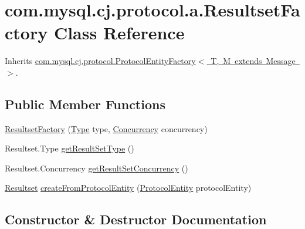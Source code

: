 \hypertarget{classcom_1_1mysql_1_1cj_1_1protocol_1_1a_1_1_resultset_factory}{}\section{com.\+mysql.\+cj.\+protocol.\+a.\+Resultset\+Factory Class Reference}
\label{classcom_1_1mysql_1_1cj_1_1protocol_1_1a_1_1_resultset_factory}


Inherits \mbox{\hyperlink{interfacecom_1_1mysql_1_1cj_1_1protocol_1_1_protocol_entity_factory}{com.\+mysql.\+cj.\+protocol.\+Protocol\+Entity\+Factory$<$ T, M extends Message $>$}}.

\subsection*{Public Member Functions}
\begin{DoxyCompactItemize}
\item 
\mbox{\hyperlink{classcom_1_1mysql_1_1cj_1_1protocol_1_1a_1_1_resultset_factory_a2c1f8425916165b5726504b5f1cdc194}{Resultset\+Factory}} (\mbox{\hyperlink{enumcom_1_1mysql_1_1cj_1_1protocol_1_1_resultset_1_1_type}{Type}} type, \mbox{\hyperlink{enumcom_1_1mysql_1_1cj_1_1protocol_1_1_resultset_1_1_concurrency}{Concurrency}} concurrency)
\item 
Resultset.\+Type \mbox{\hyperlink{classcom_1_1mysql_1_1cj_1_1protocol_1_1a_1_1_resultset_factory_a22c757bc4f5d57428ad2d34ee330cd66}{get\+Result\+Set\+Type}} ()
\item 
Resultset.\+Concurrency \mbox{\hyperlink{classcom_1_1mysql_1_1cj_1_1protocol_1_1a_1_1_resultset_factory_add802e01666fd1a41db44894232f912d}{get\+Result\+Set\+Concurrency}} ()
\item 
\mbox{\hyperlink{interfacecom_1_1mysql_1_1cj_1_1protocol_1_1_resultset}{Resultset}} \mbox{\hyperlink{classcom_1_1mysql_1_1cj_1_1protocol_1_1a_1_1_resultset_factory_a3ee901bd2ae369a6c99f8c38c280c407}{create\+From\+Protocol\+Entity}} (\mbox{\hyperlink{interfacecom_1_1mysql_1_1cj_1_1protocol_1_1_protocol_entity}{Protocol\+Entity}} protocol\+Entity)
\end{DoxyCompactItemize}


\subsection{Constructor \& Destructor Documentation}
\mbox{\label{classcom_1_1mysql_1_1cj_1_1protocol_1_1a_1_1_resultset_factory_a2c1f8425916165b5726504b5f1cdc194}} 
